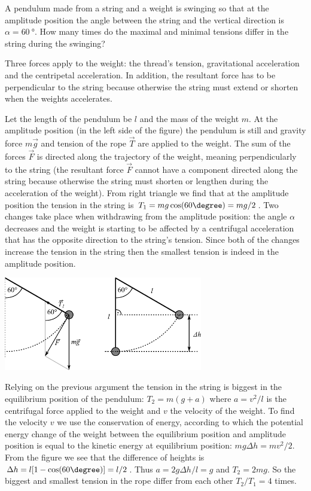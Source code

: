 {\ifEngStatement
A pendulum made from a string and a weight is swinging so that at the amplitude position the angle between the string and the vertical direction is $\alpha=\SI{60}{\degree}$. How many times do the maximal and minimal tensions differ in the string during the swinging?
\fi


\ifEngHint
Three forces apply to the weight: the thread’s tension, gravitational acceleration and the centripetal acceleration. In addition, the resultant force has to be perpendicular to the string because otherwise the string must extend or shorten when the weights accelerates.
\fi


\ifEngSolution
Let the length of the pendulum be $l$ and the mass of the weight $m$. At the amplitude position (in the left side of the figure) the pendulum is still and gravity force $m\vec{g}$ and tension of the rope $\vec{T}$ are applied to the weight. The sum of the forces $\vec{F}$ is directed along the trajectory of the weight, meaning perpendicularly to the string (the resultant force $\vec{F}$ cannot have a component directed along the string because otherwise the string must shorten or lengthen during the acceleration of the weight). From right triangle we find that at the amplitude position the tension in the string is $T_1 = mg\cos(60\degree) = mg / 2$. Two changes take place when withdrawing from the amplitude position: the angle $\alpha$ decreases and the weight is starting to be affected by a centrifugal acceleration that has the opposite direction to the string’s tension. Since both of the changes increase the tension in the string then the smallest tension is indeed in the amplitude position.
\begin{center}
	\vspace{-10pt}
	\includegraphics[width=0.65\textwidth]{2017-v2g-03-pendel-joonis}
	\vspace{-15pt}
\end{center}
Relying on the previous argument the tension in the string is biggest in the equilibrium position of the pendulum: $T_2 = m(g + a)$ where $a = v^2 / l$ is the centrifugal force applied to the weight and $v$ the velocity of the weight. To find the velocity $v$ we use the conservation of energy, according to which the potential energy change of the weight between the equilibrium position and amplitude position is equal to the kinetic energy at equilibrium position: $mg\Delta h = mv^2 / 2$. From the figure we see that the difference of heights is $\Delta h = l[1-\cos(60\degree)] = l / 2$. Thus $a = 2g\Delta h / l = g$ and $T_2 = 2mg$. So the biggest and smallest tension in the rope differ from each other $T_2 / T_1 = 4$ times.
\fi
}